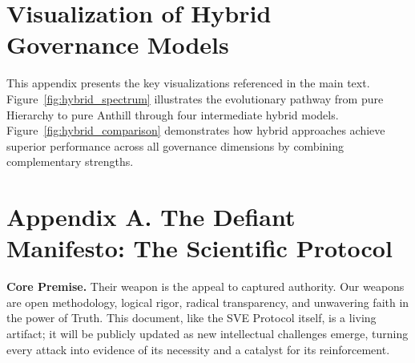 \documentclass[11pt,a4paper]{article}
\begin{document}
\begin{small}



\clearpage
\appendix

\section{Visualization of Hybrid Governance Models}
\label{app:visualization}

This appendix presents the key visualizations referenced in the main text. Figure~\ref{fig:hybrid_spectrum} illustrates the evolutionary pathway from pure Hierarchy to pure Anthill through four intermediate hybrid models. Figure~\ref{fig:hybrid_comparison} demonstrates how hybrid approaches achieve superior performance across all governance dimensions by combining complementary strengths.


\clearpage %



\section*{Appendix A. The Defiant Manifesto: The Scientific Protocol}
\label{app:manifesto}

\vspace{1em}

\noindent{}

\vspace{1.5em}

\noindent\textbf{\textcolor{headercolor}{Core Premise.}} Their weapon is the appeal to captured authority. Our weapons are open methodology, logical rigor, radical transparency, and unwavering faith in the power of Truth. This document, like the SVE Protocol itself, is a living artifact; it will be publicly updated as new intellectual challenges emerge, turning every attack into evidence of its necessity and a catalyst for its reinforcement.


\end{small}
\end{document}
